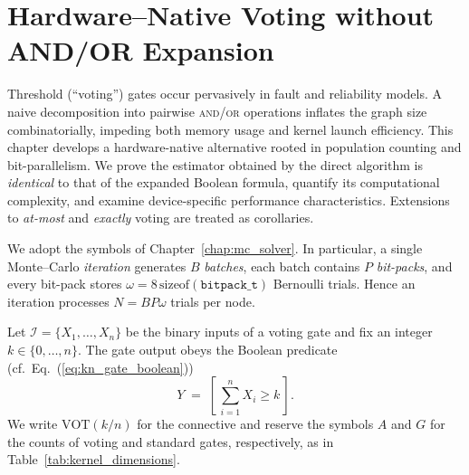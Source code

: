\chapter{Hardware--Native Voting without AND/OR Expansion}
\label{chap:voter}

Threshold (``voting'') gates occur pervasively in fault
and reliability models.  A naive decomposition into pairwise \textsc{and}/\textsc{or}
operations inflates the graph size combinatorially, impeding both memory usage
and kernel launch efficiency.  This chapter develops a hardware-native alternative
rooted in population counting and bit-parallelism. We prove the estimator obtained 
by the direct algorithm is \emph{identical} to
that of the expanded Boolean formula, quantify its computational complexity,
and examine device-specific performance characteristics.  Extensions to
\emph{at-most} and \emph{exactly} voting are treated as corollaries.


We adopt the symbols of Chapter~\ref{chap:mc_solver}.  In particular, a single
Monte–Carlo \emph{iteration} generates $B$ \emph{batches}, each batch contains
$P$ \emph{bit-packs}, and every bit-pack stores $\omega=8\,\mathrm{sizeof}(\texttt{bitpack\_t})$
Bernoulli trials.  Hence an iteration processes
\(
  N = B P \omega
\)
trials per node.

Let $\mathcal{I}=\{X_1,\dots,X_n\}$ be the binary inputs of a voting gate and
fix an integer $k\in\{0,\dots,n\}$.  The gate output obeys the Boolean
predicate (cf.~Eq.~(\ref{eq:kn_gate_boolean}))
\[
  Y\;=\;[\,\sum_{i=1}^{n} X_i \ge k\,].
\]
We write $\mathrm{VOT}(k/n)$ for the connective and reserve the symbols
$A$ and $G$ for the counts of voting and standard gates, respectively, as in
Table~\ref{tab:kernel_dimensions}.

